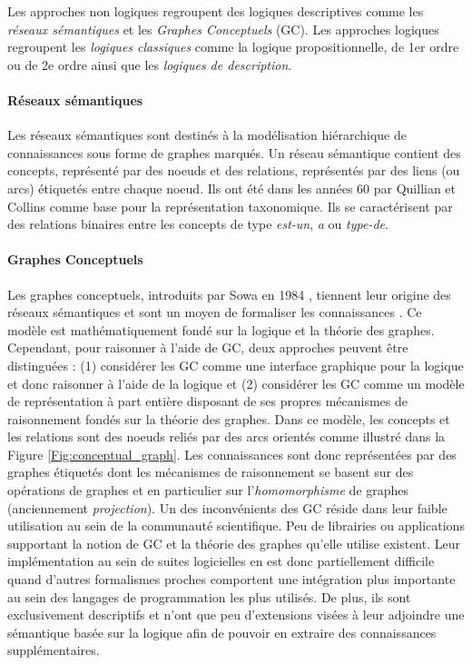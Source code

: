 Les approches non logiques regroupent des logiques descriptives comme les \textit{réseaux sémantiques} et les \textit{Graphes Conceptuels} (GC).
Les approches logiques regroupent les \textit{logiques classiques} comme la logique propositionnelle, de 1er ordre ou de 2e ordre ainsi que les \textit{logiques de description}.

\paragraph{Réseaux sémantiques}

Les réseaux sémantiques sont destinés à la modélisation hiérarchique de connaissances sous forme de graphes marqués. Un réseau sémantique contient des concepts, représenté par des noeuds et des relations, représentés par des liens (ou arcs) étiquetés entre chaque noeud. Ils ont été dans les années 60 par Quillian et Collins \cite{collins1969retrieval} comme base pour la représentation taxonomique. Ils se caractérisent par des relations binaires entre les concepts de type \textit{est-un}, \textit{a} ou \textit{type-de}.

\paragraph{Graphes Conceptuels}

Les graphes conceptuels, introduits par Sowa en 1984 \cite{sowa1983conceptual}, tiennent leur origine des réseaux sémantiques \cite{lehmann1992semantic} et sont un moyen de formaliser les connaissances \cite{chein2008graph}. Ce modèle est mathématiquement fondé sur la logique et la théorie des graphes. Cependant, pour raisonner à l'aide de GC, deux approches peuvent être distinguées : (1) considérer les GC comme une interface graphique pour la logique et donc raisonner à l’aide de la logique et (2) considérer les GC comme un modèle de représentation à part entière disposant de ses propres mécanismes de raisonnement fondés sur la théorie des graphes. Dans ce modèle, les concepts et les relations sont des noeuds reliés par des arcs orientés comme illustré dans la Figure \ref{Fig:conceptual_graph}. Les connaissances sont donc représentées par des graphes étiquetés dont les mécanismes de raisonnement se basent sur des opérations de graphes et en particulier sur l'\textit{homomorphisme} de graphes (anciennement \textit{projection}).
Un des inconvénients des GC réside dans leur faible utilisation au sein de la communauté scientifique. Peu de librairies ou applications supportant la notion de GC et la théorie des graphes qu'elle utilise existent. Leur implémentation au sein de suites logicielles en est donc partiellement difficile quand d'autres formalismes proches comportent une intégration plus importante au sein des langages de programmation les plus utilisés. De plus, ils sont exclusivement descriptifs et n'ont que peu d'extensions visées à leur adjoindre une sémantique basée sur la logique afin de pouvoir en extraire des connaissances supplémentaires.

